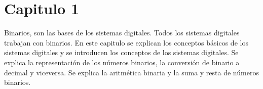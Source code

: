 \section{Capitulo 1}
    Binarios, son las bases de los sistemas digitales. Todos los
    sistemas digitales trabajan con binarios. En este capitulo se
    explican los conceptos básicos de los sistemas digitales y se
    introducen los conceptos de los sistemas digitales. Se explica
    la representación de los números binarios, la conversión de
    binario a decimal y viceversa. Se explica la aritmética binaria
    y la suma y resta de números binarios. 
        
